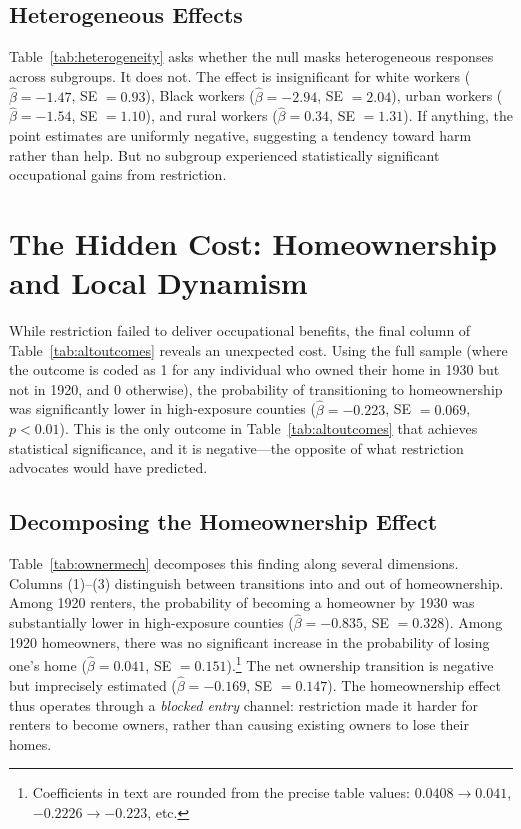 \documentclass[12pt]{article}
\begin{document}
\subsection{Heterogeneous Effects}

Table~\ref{tab:heterogeneity} asks whether the null masks heterogeneous responses across subgroups. It does not. The effect is insignificant for white workers ($\hat{\beta} = -1.47$, SE $= 0.93$), Black workers ($\hat{\beta} = -2.94$, SE $= 2.04$), urban workers ($\hat{\beta} = -1.54$, SE $= 1.10$), and rural workers ($\hat{\beta} = 0.34$, SE $= 1.31$). If anything, the point estimates are uniformly negative, suggesting a tendency toward harm rather than help. But no subgroup experienced statistically significant occupational gains from restriction.





\section{The Hidden Cost: Homeownership and Local Dynamism}
\label{sec:homeownership}

While restriction failed to deliver occupational benefits, the final column of Table~\ref{tab:altoutcomes} reveals an unexpected cost. Using the full sample (where the outcome is coded as 1 for any individual who owned their home in 1930 but not in 1920, and 0 otherwise), the probability of transitioning to homeownership was significantly lower in high-exposure counties ($\hat{\beta} = -0.223$, SE $= 0.069$, $p < 0.01$). This is the only outcome in Table~\ref{tab:altoutcomes} that achieves statistical significance, and it is negative---the opposite of what restriction advocates would have predicted.

\subsection{Decomposing the Homeownership Effect}

Table~\ref{tab:ownermech} decomposes this finding along several dimensions. Columns (1)--(3) distinguish between transitions into and out of homeownership. Among 1920 renters, the probability of becoming a homeowner by 1930 was substantially lower in high-exposure counties ($\hat{\beta} = -0.835$, SE $= 0.328$). Among 1920 homeowners, there was no significant increase in the probability of losing one's home ($\hat{\beta} = 0.041$, SE $= 0.151$).\footnote{Coefficients in text are rounded from the precise table values: $0.0408 \rightarrow 0.041$, $-0.2226 \rightarrow -0.223$, etc.} The net ownership transition is negative but imprecisely estimated ($\hat{\beta} = -0.169$, SE $= 0.147$). The homeownership effect thus operates through a \textit{blocked entry} channel: restriction made it harder for renters to become owners, rather than causing existing owners to lose their homes.
\end{document}
